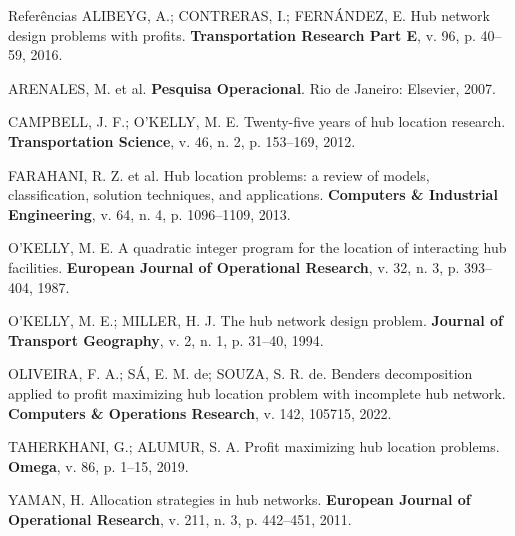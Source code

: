 \documentclass[aspectratio=169, 10pt]{beamer}
\begin{document}
\begin{frame}{Referências}
  \scriptsize
  ALIBEYG, A.; CONTRERAS, I.; FERNÁNDEZ, E. Hub network design problems with profits. \textbf{Transportation Research Part E}, v. 96, p. 40--59, 2016.

  \vspace{1pt}
  ARENALES, M. et al. \textbf{Pesquisa Operacional}. Rio de Janeiro: Elsevier, 2007.

  \vspace{1pt}
  CAMPBELL, J. F.; O'KELLY, M. E. Twenty-five years of hub location research. \textbf{Transportation Science}, v. 46, n. 2, p. 153--169, 2012.

  \vspace{1pt}
  FARAHANI, R. Z. et al. Hub location problems: a review of models, classification, solution techniques, and applications. \textbf{Computers \& Industrial Engineering}, v. 64, n. 4, p. 1096--1109, 2013.

  \vspace{1pt}
  O'KELLY, M. E. A quadratic integer program for the location of interacting hub facilities. \textbf{European Journal of Operational Research}, v. 32, n. 3, p. 393--404, 1987.

  \vspace{1pt}
  O'KELLY, M. E.; MILLER, H. J. The hub network design problem. \textbf{Journal of Transport Geography}, v. 2, n. 1, p. 31--40, 1994.

  \vspace{1pt}
  OLIVEIRA, F. A.; SÁ, E. M. de; SOUZA, S. R. de. Benders decomposition applied to profit maximizing hub location problem with incomplete hub network. \textbf{Computers \& Operations Research}, v. 142, 105715, 2022.

  \vspace{1pt}
  TAHERKHANI, G.; ALUMUR, S. A. Profit maximizing hub location problems. \textbf{Omega}, v. 86, p. 1--15, 2019.

  \vspace{1pt}
  YAMAN, H. Allocation strategies in hub networks. \textbf{European Journal of Operational Research}, v. 211, n. 3, p. 442--451, 2011.
\end{frame}
\end{document}
